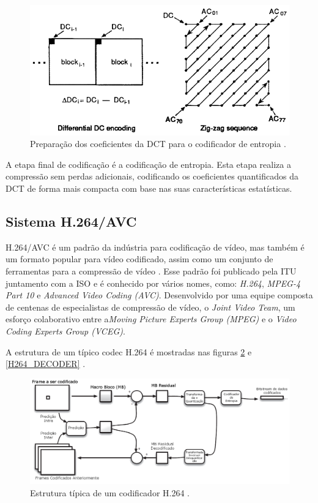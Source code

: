 \begin{figure}[h]
	\centering
	\includegraphics[scale=0.55]{figuras/ZIG-ZAG.png}
	\caption{Preparação dos coeficientes da DCT para o codificador de entropia \cite{wallace1991jpeg}.}
	\label{ZIG_ZAG}
\end{figure}

A etapa final de codificação é a codificação de entropia.  Esta etapa realiza a compressão sem perdas adicionais, codificando os coeficientes quantificados da DCT de forma mais compacta com base nas suas características estatísticas.

\subsection{Sistema H.264/AVC}

H.264/AVC é um padrão da indústria para codificação de vídeo, mas também é um formato popular para vídeo codificado, assim como um conjunto de ferramentas para a compressão de vídeo \cite{richardson2011h}. Esse padrão foi publicado pela ITU juntamento com a ISO e é conhecido por vários nomes, como: \textit{H.264}, \textit{MPEG-4 Part 10} e \textit{Advanced Video Coding (AVC)}. Desenvolvido por uma equipe composta de centenas de especialistas de compressão de vídeo, o \textit{Joint Video Team}, um esforço colaborativo entre a\textit{Moving Picture Experts Group (MPEG)} e o \textit{Video Coding Experts Group (VCEG)}.

A estrutura de um típico codec H.264 é mostradas nas figuras \ref{H264_ENCODER} e \ref{H264_DECODER} \cite{richardson2011h}.

\begin{figure}[h]
	\centering
	\includegraphics[scale=0.45]{figuras/H264_CODIFICADOR.png}
	\caption{Estrutura típica de um codificador H.264 \cite{richardson2011h}.}
	\label{H264_ENCODER}
\end{figure}

